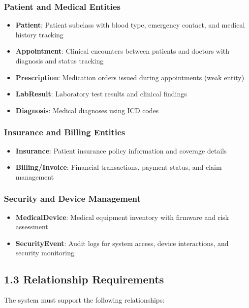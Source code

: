 \subsubsection*{Patient and Medical Entities}
\begin{itemize}
    \item \textbf{Patient}: Patient subclass with blood type, emergency contact, and medical history tracking
    \item \textbf{Appointment}: Clinical encounters between patients and doctors with diagnosis and status tracking
    \item \textbf{Prescription}: Medication orders issued during appointments (weak entity)
    \item \textbf{LabResult}: Laboratory test results and clinical findings
    \item \textbf{Diagnosis}: Medical diagnoses using ICD codes
\end{itemize}

\subsubsection*{Insurance and Billing Entities}
\begin{itemize}
    \item \textbf{Insurance}: Patient insurance policy information and coverage details
    \item \textbf{Billing/Invoice}: Financial transactions, payment status, and claim management
\end{itemize}

\subsubsection*{Security and Device Management}
\begin{itemize}
    \item \textbf{MedicalDevice}: Medical equipment inventory with firmware and risk assessment
    \item \textbf{SecurityEvent}: Audit logs for system access, device interactions, and security monitoring
\end{itemize}

\subsection*{1.3 Relationship Requirements}

The system must support the following relationships:

